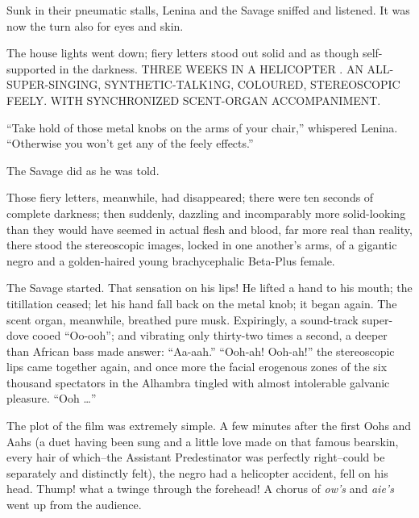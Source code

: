 \documentclass[12pt]{report}
\begin{document}
Sunk in their pneumatic stalls, Lenina and the Savage sniffed and
listened. It was now the turn also for eyes and skin.

The house lights went down; fiery letters stood out solid and as though
self-supported in the darkness. THREE WEEKS IN A HELICOPTER . AN
ALL-SUPER-SINGING, SYNTHETIC-TALK1NG, COLOURED, STEREOSCOPIC FEELY. WITH
SYNCHRONIZED SCENT-ORGAN ACCOMPANIMENT.

``Take hold of those metal knobs on the arms of your chair,'' whispered
Lenina. ``Otherwise you won't get any of the feely effects.''

The Savage did as he was told.

Those fiery letters, meanwhile, had disappeared; there were ten seconds
of complete darkness; then suddenly, dazzling and incomparably more
solid-looking than they would have seemed in actual flesh and blood, far
more real than reality, there stood the stereoscopic images, locked in
one another's arms, of a gigantic negro and a golden-haired young
brachycephalic Beta-Plus female.

The Savage started. That sensation on his lips! He lifted a hand to his
mouth; the titillation ceased; let his hand fall back on the metal knob;
it began again. The scent organ, meanwhile, breathed pure musk.
Expiringly, a sound-track super-dove cooed ``Oo-ooh''; and vibrating
only thirty-two times a second, a deeper than African bass made answer:
``Aa-aah.'' ``Ooh-ah! Ooh-ah!'' the stereoscopic lips came together
again, and once more the facial erogenous zones of the six thousand
spectators in the Alhambra tingled with almost intolerable galvanic
pleasure. ``Ooh \ldots{}''

The plot of the film was extremely simple. A few minutes after the first
Oohs and Aahs (a duet having been sung and a little love made on that
famous bearskin, every hair of which--the Assistant Predestinator was
perfectly right--could be separately and distinctly felt), the negro had
a helicopter accident, fell on his head. Thump! what a twinge through
the forehead! A chorus of \emph{ow's} and \emph{aie's} went up from the
audience.
\end{document}
